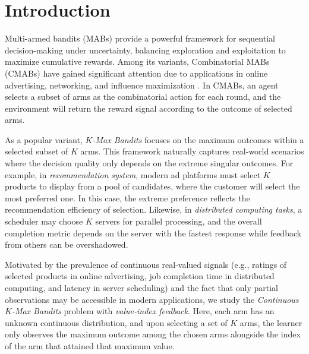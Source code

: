 \section{Introduction}

Multi-armed bandits (MABs) provide a powerful framework for sequential decision-making under uncertainty, balancing exploration and exploitation to maximize cumulative rewards. Among its variants, Combinatorial MABs (CMABs) \citet{cesa2012combinatorial,chen2013combinatorial} have gained significant attention due to applications in online advertising, networking, and influence maximization \citep{gai2012combinatorial,kveton2015combinatorial, chen2009efficient,chen2013combinatorial}. In CMABs, an agent selects a subset of arms as the combinatorial action for each round, and the environment will return the reward signal according to the outcome of selected arms. 

As a popular variant,  \textit{$K$-Max Bandits} \citep{goel2006asking,gopalan2014thompson} focuses on the maximum outcomes within a selected subset of $K$ arms. This framework naturally captures real-world scenarios where the decision quality only depends on the extreme singular outcomes. For example, in \textit{recommendation system}, 
modern ad platforms must select $K$ products to display from a pool of candidates, where the customer will select the most preferred one.
In this case, the extreme preference reflects the recommendation efficiency of selection.
Likewise, in \emph{distributed computing tasks}, a scheduler may choose $K$ servers for parallel processing, and the overall completion metric depends on the server with the fastest response while feedback from others can be overshadowed. 

Motivated by the prevalence of continuous real-valued signals (e.g., ratings of selected products in online advertising, job completion time in distributed computing, and latency in server scheduling) and the fact that only partial observations may be accessible in modern applications, we study the \emph{Continuous $K$-Max Bandits} problem with \emph{value-index feedback}. Here, each arm has an unknown continuous distribution, and upon selecting a set of $K$ arms, the learner only observes the {maximum} outcome among the chosen arms alongside the {index} of the arm that attained that maximum value.


